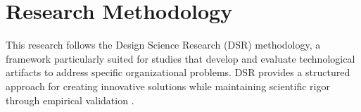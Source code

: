 
\section{Research Methodology}
  
    This research follows the Design Science Research (DSR) methodology, a framework particularly suited for studies that develop and evaluate technological artifacts to address specific organizational problems. DSR provides a structured approach for creating innovative solutions while maintaining scientific rigor through empirical validation \citep{hevner2007three}.
    
